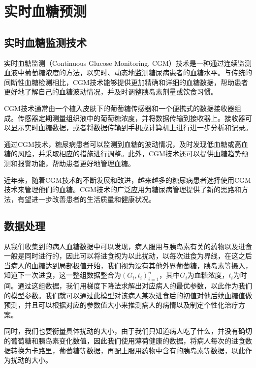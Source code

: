 \chapter{实时血糖预测}\label{chap:predict}
\section{实时血糖监测技术}
实时血糖监测（Continuous Glucose Monitoring, CGM）技术是一种通过连续监测血液中葡萄糖浓度的方法，以实时、动态地监测糖尿病患者的血糖水平。与传统的间断性血糖检测相比，CGM技术能够提供更加精确和详细的血糖数据，帮助患者更好地了解自己的血糖波动情况，并及时调整胰岛素剂量或饮食习惯。

CGM技术通常由一个植入皮肤下的葡萄糖传感器和一个便携式的数据接收器组成。传感器定期测量组织液中的葡萄糖浓度，并将数据传输到接收器上。接收器可以显示实时血糖数据，或者将数据传输到手机或计算机上进行进一步分析和记录。

通过CGM技术，糖尿病患者可以监测到血糖的波动情况，及时发现低血糖或高血糖的风险，并采取相应的措施进行调整。此外，CGM技术还可以提供血糖趋势预测和报警功能，帮助患者更好地管理血糖\cite{vigersky2017role}。

近年来，随着CGM技术的不断发展和改进，越来越多的糖尿病患者选择使用CGM技术来管理他们的血糖。CGM技术的广泛应用为糖尿病管理提供了新的思路和方法，有望进一步改善患者的生活质量和健康状况。
\section{数据处理}
从我们收集到的病人血糖数据中可以发现，病人服用与胰岛素有关的药物以及进食一般是同时进行的，因此可以将进食视为以此扰动，以每次进食为界线，在这之后当病人的血糖达到局部极值开始，我们视为没有其他外界葡萄糖，胰岛素等摄入，知道下一次进食，这一整组数据整合为$(G_i,t_i)_{i=1}^n$，其中$G_i$为血糖浓度，$t_i$为时间。通过这组数据，我们用梯度下降法求解出对应病人的最优参数，以此作为我们的模型参数。我们就可以通过此模型对该病人某次进食后的初值对他后续血糖值做预测，并且可以根据对应的参数值大小来推测病人的病情以及制定个性化治疗方案。

同时，我们也要衡量具体扰动的大小，由于我们只知道病人吃了什么，并没有确切的葡萄糖和胰岛素变化数值，因此我们使用薄荷健康的数据，将病人每次的进食数据转换为卡路里，葡萄糖等数据，再配上服用药物中含有的胰岛素等数据，以此作为扰动的大小。
